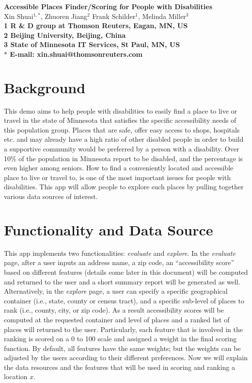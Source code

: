 \documentclass[10pt]{article}
\date{}
\begin{document}
\begin{flushleft}
{\Large
\textbf{Accessible Places Finder/Scoring for People with Disabilities}
}
\\
Xin Shuai$^{1,\ast}$,
Zhuoren Jiang$^{2}$
Frank Schilder$^{1}$,
Melinda Miller$^{3}$
\\
\bf{1} R \& D group at Thomson Reuters, Eagan, MN, US
\\
\bf{2} Beijing University, Beijing, China
\\
\bf{3} State of Minnesota IT Services, St Paul, MN, US
\\
$\ast$ E-mail: xin.shuai@thomsonreuters.com
\end{flushleft}


\section{Background}
This demo aims to help people with disabilities to easily find a place to live or travel in the state of Minnesota that satisfies the specific accessibility needs of this population group. Places that are safe, offer easy access to shops, hospitals etc. and may already have a high ratio of other disabled people in order to build a supportive community would be preferred by a person with a disability. Over 10\% of the population in Minnesota report to be disabled, and the percentage is even higher among seniors. How to find a conveniently located and accessible place to live or travel to, is one of the most important issues for people with disabilities. This app will allow people to explore such places by pulling together various data sources of interest.

\section{Functionality and Data Source}
This app implements two functionalities: \emph{evaluate} and \emph{explore}. In the \emph{evaluate} page, after a user inputs an address name, a zip code, an ``accessibility score'' based on different features (details come later in this document) will be computed and returned to the user and a short summary report will be generated as well. Alternatively, in the \emph{explore} page, a user can specify a specific geographical container (i.e., state, county or census tract), and a specific sub-level of places to rank (i.e., county, city, or zip code). As a result accessibility scores will be computed at the requested container and level of places and a ranked list of places will returned to the user. Particularly, each feature that is involved in the ranking is scored on a 0 to 100 scale and assigned a weight in the final scoring function. By default, all features have the same weights; but the weights can be adjusted by the users according to their different preferences.
Now we will explain the data resources and the features that will be used in scoring and ranking a location $x$. 
\end{document}
